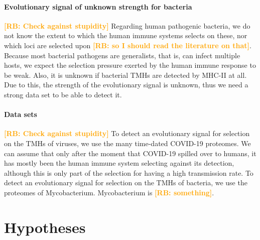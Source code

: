 \documentclass{article}
\newcommand{\richel}[1]{\textcolor{orange}{\textbf{[RB: #1]}}}
\begin{document}
\paragraph{Evolutionary signal of unknown strength for bacteria}

\richel{Check against stupidity}
Regarding human pathogenic bacteria, we do not know the extent to which the 
human immune systems selects on these, nor which loci are selected
upon \richel{so I should read the literature on that}.
Because most bacterial pathogens are generalists, that is,
can infect multiple hosts, we expect the selection pressure exerted
by the human immune response to be weak.
Also, it is unknown if bacterial TMHs are detected by MHC-II at all.
Due to this, the strength of the evolutionary signal is unknown,
thus we need a strong data set to be able to detect it.

\paragraph{Data sets}

\richel{Check against stupidity}
To detect an evolutionary signal for selection on the TMHs of viruses, 
we use the many time-dated COVID-19 proteomes.
We can assume that only after the moment that COVID-19 spilled over 
to humans, it has mostly been the human immune system selecting against
its detection, although this is only part of the selection for 
having a high transmission rate.
To detect an evolutionary signal for selection on the TMHs of bacteria, 
we use the proteomes of Mycobacterium. Mycobacterium is \richel{something}.


\section{Hypotheses}
\end{document}
